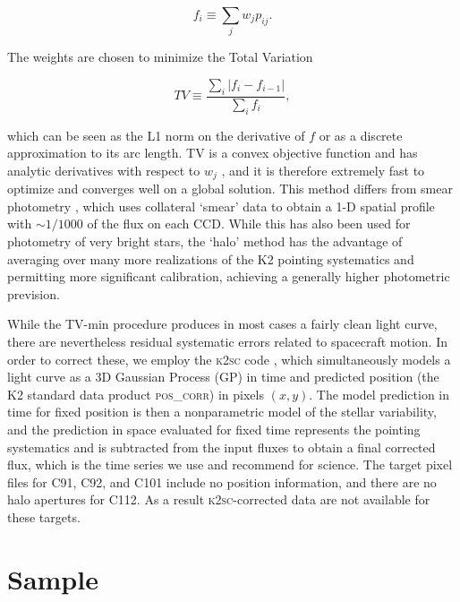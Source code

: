 \documentclass[twocolumn]{aastex62}
\begin{document}
\begin{equation}
    f_i \equiv \sum_j {w_j p_{ij}}.
\end{equation}

\noindent The weights are chosen to minimize the Total Variation

\begin{equation}
    TV \equiv \frac{\sum_i{|f_i - f_{i-1}|}}{\sum_i {f_i}},
\end{equation}

\noindent which can be seen as the L1 norm on the derivative of $f$ or as a discrete approximation to its arc length. TV is a convex objective function and has analytic derivatives with respect to $w_j$ \citep[calculated with \texttt{autograd};][]{autograd}, and it is therefore extremely fast to optimize and converges well on a global solution.
This method differs from smear photometry \citep{Pope2016}, which uses collateral `smear' data to obtain a 1-D spatial profile with $\sim 1/1000$ of the flux on each CCD. While this has also been used for photometry of very bright stars, the `halo' method has the advantage of averaging over many more realizations of the K2 pointing systematics and permitting more significant calibration, achieving a generally higher photometric prevision.


While the TV-min procedure produces in most cases a fairly clean light curve, there are nevertheless residual systematic errors related to spacecraft motion. In order to correct these, we employ the \textsc{k2sc} code \citep{Aigrain2015,k2sc}, which simultaneously models a light curve as a 3D Gaussian Process (GP) in time and predicted position (the K2 standard data product \textsc{pos\_corr}) in pixels $(x,y)$. The model prediction in time for fixed position is then a nonparametric model of the stellar variability, and the prediction in space evaluated for fixed time represents the pointing systematics and is subtracted from the input fluxes to obtain a final corrected flux, which is the time series we use and recommend for science. The target pixel files for C91, C92, and C101 include no position information, and there are no halo apertures for C112. As a result \textsc{k2sc}-corrected data are not available for these targets.


\section{Sample}
\label{sec:sample}
\end{document}
